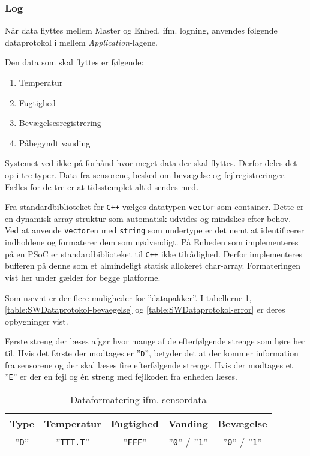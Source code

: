 \subsubsection{Log}

Når data flyttes mellem Master og Enhed, ifm. logning, anvendes følgende dataprotokol i mellem \textit{Application}-lagene.

Den data som skal flyttes er følgende:

\begin{enumerate}
	\item Temperatur
	\item Fugtighed
	\item Bevægelsesregistrering
	\item Påbegyndt vanding
\end{enumerate}

Systemet ved ikke på forhånd hvor meget data der skal flyttes. Derfor deles det op i tre typer. Data fra sensorene, besked om bevægelse og fejlregistreringer.
Fælles for de tre er at tidsstemplet altid sendes med.

Fra standardbiblioteket for \verb'C++' vælges datatypen \verb+vector+ som container. Dette er en dynamisk array-struktur som automatisk udvides og mindskes efter behov.
Ved at anvende \verb+vector+en med \verb+string+ som undertype er det nemt at identificerer indholdene og formaterer dem som nødvendigt. På Enheden som implementeres på en PSoC er standardbiblioteket til \verb-C++- ikke tilrådighed. Derfor implementeres bufferen på denne som et almindeligt statisk allokeret char-array. Formateringen vist her under gælder for begge platforme.

Som nævnt er der flere muligheder for ''datapakker''. I tabellerne \ref{table:SWDataprotokol-sensor}, \ref{table:SWDataprotokol-bevaegelse} og \ref{table:SWDataprotokol-error} er deres opbygninger vist.

Første streng der læses afgør hvor mange af de efterfølgende strenge som høre her til. Hvis det første der modtages er ''\verb+D+'', betyder det at der kommer information fra sensorene og der skal læses fire efterfølgende strenge.
Hvis der modtages et ''\verb+E+'' er der en fejl og én streng med fejlkoden fra enheden læses.

\begin{table}[h]
	\caption{Dataformatering ifm. sensordata}
	\centering
	\begin{tabular}{|c|c|c|c|c|}
		\hline 
		\textbf{Type} & \textbf{Temperatur} & \textbf{Fugtighed} & \textbf{Vanding} & \textbf{Bevægelse}\\ 
		\hline 
		''\verb+D+'' & ''\verb+TTT.T+'' & ''\verb+FFF+'' & ''\verb+0+'' / ''\verb+1+'' & ''\verb+0+'' / ''\verb+1+'' \\ 
		\hline 
	\end{tabular} 
	\label{table:SWDataprotokol-sensor}
\end{table}

